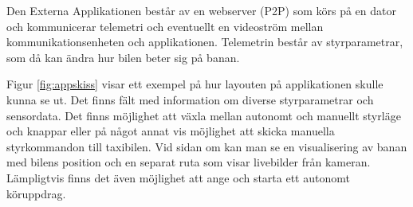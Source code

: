 \documentclass[10pt,oneside,swedish]{lips}
\begin{document}
Den Externa Applikationen består av en webserver (P2P) som körs på en dator och kommunicerar telemetri och eventuellt en videoström mellan kommunikationsenheten och applikationen. Telemetrin består av styrparametrar, som då kan ändra hur bilen beter sig på banan. 

Figur \ref{fig:appskiss} visar ett exempel på hur layouten på applikationen skulle kunna se ut. Det finns fält med information om diverse styrparametrar och sensordata. Det finns möjlighet att växla mellan autonomt och manuellt styrläge och knappar eller på något annat vis möjlighet att skicka manuella styrkommandon till taxibilen. Vid sidan om kan man se en visualisering av banan med bilens position och en separat ruta som visar livebilder från kameran. Lämpligtvis finns det även möjlighet att ange och starta ett autonomt köruppdrag. 


% 
\end{document}
